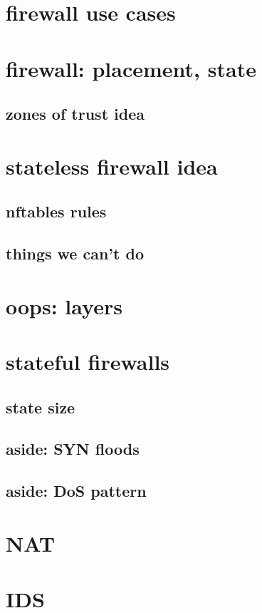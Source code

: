 \section{firewall use cases}



\section{firewall: placement, state}


\subsection{zones of trust idea}


\section{stateless firewall idea}


\subsection{nftables rules}


\subsection{things we can't do}


\section{oops: layers}


\section{stateful firewalls}


\subsection{state size}


\subsection{aside: SYN floods}


\subsection{aside: DoS pattern}


\section{NAT}


\section{IDS}


